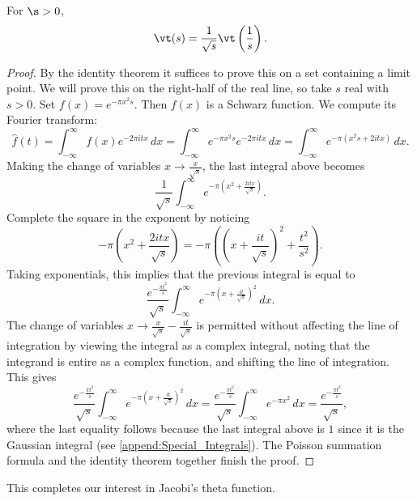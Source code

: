       \begin{theorem}
        For $\s > 0$,
        \[
          \vt(s) = \frac{1}{\sqrt{s}}\vt\left(\frac{1}{s}\right).
        \]
      \end{theorem}
      \begin{proof}
        By the identity theorem it suffices to prove this on a set containing a limit point. We will prove this on the right-half of the real line, so take $s$ real with $s > 0$. Set $f(x) = e^{-\pi x^{2}s}$. Then $f(x)$ is a Schwarz function. We compute its Fourier transform:
        \[
          \hat{f}(t) = \int_{-\infty}^{\infty}f(x)e^{-2\pi itx}\,dx = \int_{-\infty}^{\infty}e^{-\pi x^{2}s}e^{-2\pi itx}\,dx = \int_{-\infty}^{\infty}e^{-\pi(x^{2}s+2itx)}\,dx.
        \]
        Making the change of variables $x \to \frac{x}{\sqrt{s}}$, the last integral above becomes
        \[
          \frac{1}{\sqrt{s}}\int_{-\infty}^{\infty}e^{-\pi\left(x^{2}+\frac{2itx}{\sqrt{s}}\right)}.
        \]
        Complete the square in the exponent by noticing
        \[
          -\pi\left(x^{2}+\frac{2itx}{\sqrt{s}}\right) = -\pi\left(\left(x+\frac{it}{\sqrt{s}}\right)^{2}+\frac{t^{2}}{s^{2}}\right).
        \]
        Taking exponentials, this implies that the previous integral is equal to
        \[
          \frac{e^{-\frac{\pi t^{2}}{s}}}{\sqrt{s}}\int_{-\infty}^{\infty}e^{-\pi\left(x+\frac{it}{\sqrt{s}}\right)^{2}}\,dx.
        \]
        The change of variables $x \to \frac{x}{\sqrt{s}}-\frac{it}{\sqrt{s}}$ is permitted without affecting the line of integration by viewing the integral as a complex integral, noting that the integrand is entire as a complex function, and shifting the line of integration. This gives
        \[
          \frac{e^{-\frac{\pi t^{2}}{s}}}{\sqrt{s}}\int_{-\infty}^{\infty}e^{-\pi\left(x+\frac{it}{\sqrt{s}}\right)^{2}}\,dx = \frac{e^{-\frac{\pi t^{2}}{s}}}{\sqrt{s}}\int_{-\infty}^{\infty}e^{-\pi x^{2}}\,dx = \frac{e^{-\frac{\pi t^{2}}{s}}}{\sqrt{s}},
        \]
        where the last equality follows because the last integral above is $1$ since it is the Gaussian integral (see \cref{append:Special_Integrals}). The Poisson summation formula and the identity theorem together finish the proof.
      \end{proof}

      This completes our interest in Jacobi's theta function.
